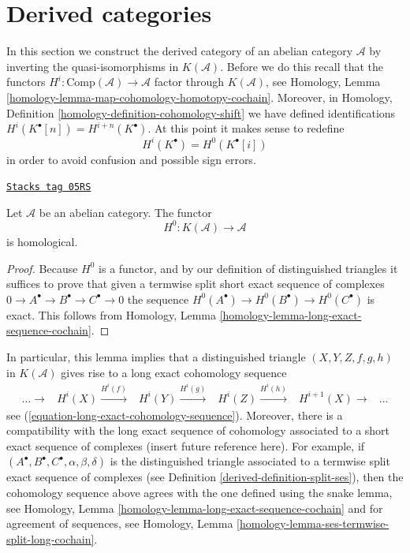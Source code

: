 \section{Derived categories}
\label{derived-section-derived-categories}
In this section we construct the derived category of an abelian category
$\mathcal{A}$ by inverting the quasi-isomorphisms in $K(\mathcal{A})$.
Before we do this recall that the functors
$H^i : \text{Comp}(\mathcal{A}) \to \mathcal{A}$
factor through $K(\mathcal{A})$, see
Homology, Lemma \ref{homology-lemma-map-cohomology-homotopy-cochain}.
Moreover, in
Homology, Definition \ref{homology-definition-cohomology-shift}
we have defined identifications $H^i(K^\bullet[n]) = H^{i + n}(K^\bullet)$.
At this point it makes sense to redefine
$$
H^i(K^\bullet) = H^0(K^\bullet[i])
$$
in order to avoid confusion and possible sign errors.

\begin{lemma}
\label{derived-lemma-cohomology-homological}
\href{https://stacks.math.columbia.edu/tag/05RS}{\texttt{Stacks tag 05RS}}

Let $\mathcal{A}$ be an abelian category. The functor
$$
H^0 : K(\mathcal{A}) \longrightarrow \mathcal{A}
$$
is homological.
\end{lemma}

\begin{proof}
Because $H^0$ is a functor, and by our definition of distinguished triangles
it suffices to prove that given a termwise split short exact sequence
of complexes $0 \to A^\bullet \to B^\bullet \to C^\bullet \to 0$
the sequence $H^0(A^\bullet) \to H^0(B^\bullet) \to H^0(C^\bullet)$
is exact. This follows from
Homology, Lemma \ref{homology-lemma-long-exact-sequence-cochain}.
\end{proof}

In particular, this lemma implies that a distinguished triangle
$(X, Y, Z, f, g, h)$ in $K(\mathcal{A})$ gives rise to a long exact
cohomology sequence
\begin{equation}
\label{equation-long-exact-cohomology-sequence-D}
\begin{array}{cccccc}\ldots \longrightarrow & H^i(X) \overset{H^i(f)}{\longrightarrow} & H^i(Y) \overset{H^i(g)}{\longrightarrow} & H^i(Z) \overset{H^i(h)}{\longrightarrow} & H^{i + 1}(X) \longrightarrow & \ldots\end{array}
\end{equation}
see (\ref{equation-long-exact-cohomology-sequence}). Moreover, there is
a compatibility with the long exact sequence of cohomology associated to
a short exact sequence of complexes (insert future reference here). For
example, if $(A^\bullet, B^\bullet, C^\bullet, \alpha, \beta, \delta)$
is the distinguished triangle associated to a termwise split exact
sequence of complexes (see
Definition \ref{derived-definition-split-ses}),
then the cohomology sequence above agrees with the one defined using the
snake lemma, see
Homology, Lemma \ref{homology-lemma-long-exact-sequence-cochain}
and for agreement of sequences, see
Homology, Lemma \ref{homology-lemma-ses-termwise-split-long-cochain}.

